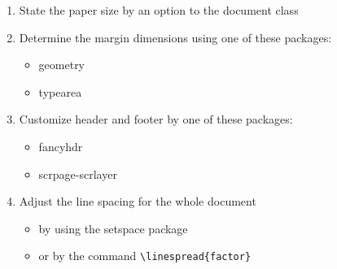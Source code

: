 \documentclass{article}
\begin{document}
\begin{enumerate}
  \item State the paper size by an option to the
        document class
  \item Determine the margin dimensions using one
        of these packages:
    \begin{itemize}
      \item geometry
      \item typearea
    \end{itemize}
  \item Customize header and footer by one
        of these packages:
    \begin{itemize}
      \item fancyhdr
      \item scrpage-scrlayer
    \end{itemize}
  \item Adjust the line spacing for the whole document
    \begin{itemize}
      \item by using the setspace package
      \item or by the command
            \verb|\linespread{factor}|
  \end{itemize}
\end{enumerate}
\end{document}
